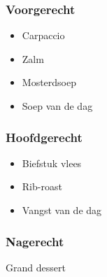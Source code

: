 \subsubsection*{Voorgerecht}
\begin{itemize}
	\item Carpaccio
	\item Zalm
	\item Mosterdsoep
	\item Soep van de dag
\end{itemize}

\subsubsection*{Hoofdgerecht}
\begin{itemize}
	\item Biefstuk vlees
	\item Rib-roast
	\item Vangst van de dag
\end{itemize}

\subsubsection*{Nagerecht}
Grand dessert
